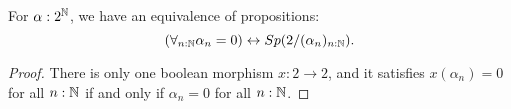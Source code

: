 \begin{lemma}\label{ClosedPropAsSpectrum}
  For $\alpha:2^{\mathbb{N}}$, we have an equivalence of propositions: 
  $$
    (\forall_{n:\mathbb{N}} \alpha_n = 0 )\leftrightarrow Sp(2/(\alpha_n)_{n:\mathbb{N}}).
  $$
\end{lemma}
\begin{proof}
  There is only one boolean morphism $x:2\to 2$, and it satisfies 
  $x(\alpha_n) = 0$ for all $n:\mathbb{N}$ if and only if
  $\alpha_n = 0$ for all $n:\mathbb{N}$. 
\end{proof}





